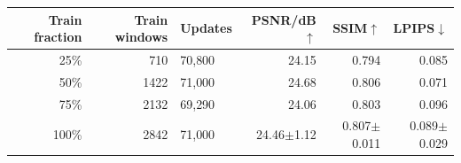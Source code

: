 \begin{tabular}{@{}rrlrrr@{}}
\toprule
Train fraction & Train windows & Updates & PSNR/dB$\uparrow$ & SSIM$\uparrow$ & LPIPS$\downarrow$\\
\midrule
25\% & 710 & 70{,}800 & 24.15 & 0.794 & 0.085 \\
50\% & 1422 & 71{,}000 & 24.68 & 0.806 & 0.071 \\
75\% & 2132 & 69{,}290 & 24.06 & 0.803 & 0.096 \\
100\% & 2842 & 71{,}000 & 24.46$\pm$1.12 & 0.807$\pm$0.011 & 0.089$\pm$0.029 \\
\bottomrule
\end{tabular}
